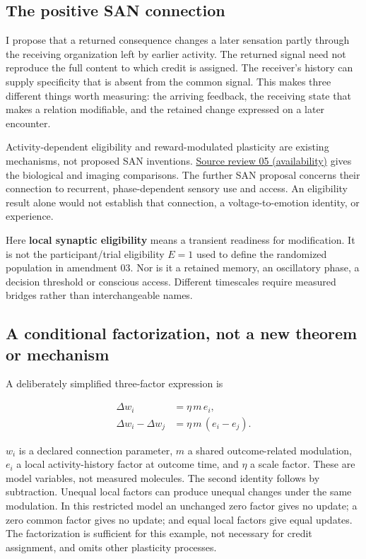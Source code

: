\documentclass[
  american,
  11pt,
  letterpaper,
]{article}
\begin{document}
\subsection{The positive SAN connection}\label{the-positive-san-connection}

I propose that a returned consequence changes a later sensation partly through the receiving organization left by earlier activity. The returned signal need not reproduce the full content to which credit is assigned. The receiver's history can supply specificity that is absent from the common signal. This makes three different things worth measuring: the arriving feedback, the receiving state that makes a relation modifiable, and the retained change expressed on a later encounter.

Activity-dependent eligibility and reward-modulated plasticity are existing mechanisms, not proposed SAN inventions. \href{https://github.com/v5ma/v5ma.github.io/blob/master/papers/companions/learning-to-feel-v1.0/ARTIFACT-AVAILABILITY.md\#artifact-14}{Source review 05 (availability)} gives the biological and imaging comparisons. The further SAN proposal concerns their connection to recurrent, phase-dependent sensory use and access. An eligibility result alone would not establish that connection, a voltage-to-emotion identity, or experience.

Here \textbf{local synaptic eligibility} means a transient readiness for modification. It is not the participant/trial eligibility \(E=1\) used to define the randomized population in amendment 03. Nor is it a retained memory, an oscillatory phase, a decision threshold or conscious access. Different timescales require measured bridges rather than interchangeable names.

\subsection{A conditional factorization, not a new theorem or mechanism}\label{a-conditional-factorization-not-a-new-theorem-or-mechanism}

A deliberately simplified three-factor expression is

\[\begin{aligned}\Delta w_i&=\eta\,m\,e_i,\\\Delta w_i-\Delta w_j&=\eta\,m\,(e_i-e_j).\end{aligned}\]

\(w_i\) is a declared connection parameter, \(m\) a shared outcome-related modulation, \(e_i\) a local activity-history factor at outcome time, and \(\eta\) a scale factor. These are model variables, not measured molecules. The second identity follows by subtraction. Unequal local factors can produce unequal changes under the same modulation. In this restricted model an unchanged zero factor gives no update; a zero common factor gives no update; and equal local factors give equal updates. The factorization is sufficient for this example, not necessary for credit assignment, and omits other plasticity processes.
\end{document}
